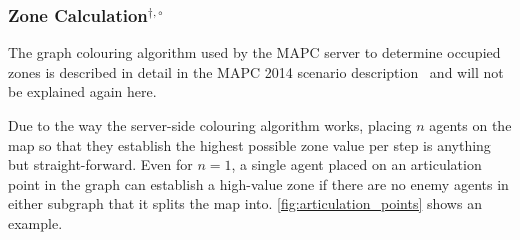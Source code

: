 \subsubsection[Zone Calculation]{Zone Calculation$^{\dagger,\circ}$}
\label{alg:zon_calculation}
The graph colouring algorithm used by the MAPC server to determine occupied zones is described in detail in the MAPC 2014 scenario description~\cite{ahlbrecht_mapc_2014} and will not be explained again here.

Due to the way the server-side colouring algorithm works, placing $n$ agents on the map so that they establish the highest possible zone value per step is anything but straight-forward.
Even for $n = 1$, a single agent placed on an articulation point in the graph can establish a high-value zone if there are no enemy agents in either subgraph that it splits the map into.
\autoref{fig:articulation_points} shows an example.
